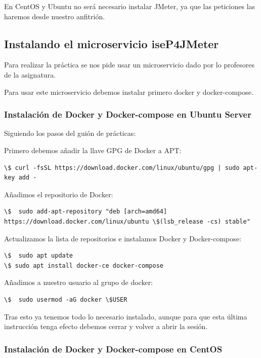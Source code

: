 \documentclass[12pt, spanish]{article}
\begin{document}
En CentOS y Ubuntu no será necesario instalar JMeter, ya que las peticiones las haremos desde nuestro anfitrión.

\subsection{Instalando el microservicio iseP4JMeter}

Para realizar la práctica se nos pide usar un microservicio dado por lo profesores de la asignatura\cite{iseP4JMeter}.

Para usar este microservicio debemos instalar primero docker y docker-compose.

\subsubsection{Instalación de Docker y Docker-compose en Ubuntu Server}

Siguiendo los pasos del guión de prácticas:

Primero debemos añadir la llave GPG de Docker a APT:

\begin{verbatim}
\$ curl -fsSL https://download.docker.com/linux/ubuntu/gpg | sudo apt-key add - 
\end{verbatim}

Añadimos el repositorio de Docker:

\begin{verbatim}
\$  sudo add-apt-repository "deb [arch=amd64] https://download.docker.com/linux/ubuntu \$(lsb_release -cs) stable"
\end{verbatim}


Actualizamos la lista de repositorios e instalamos Docker y Docker-compose:
\begin{verbatim}
\$  sudo apt update
\$ sudo apt install docker-ce docker-compose
\end{verbatim}

Añadimos a nuestro usuario al grupo de docker:
\begin{verbatim}
\$  sudo usermod -aG docker \$USER
\end{verbatim}

Tras esto ya tenemos todo lo necesario instalado, aunque para que esta última instrucción tenga efecto debemos cerrar y volver a abrir la sesión.


\subsubsection{Instalación de Docker y Docker-compose en CentOS}
\end{document}

